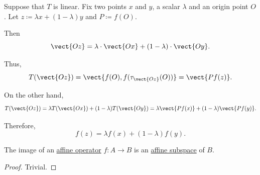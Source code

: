\begin{defproof}
   Suppose that \( T \) is linear. Fix two points \( x \) and \( y \), a scalar \( \lambda \) and an origin point \( O \). Let \( z \coloneqq \lambda x + (1 - \lambda) y \) and \( P \coloneqq f(O) \).

  Then
  \begin{equation*}
    \vect{Oz} = \lambda \cdot \vect{Ox} + (1 - \lambda) \cdot \vect{Oy}.
  \end{equation*}

  Thus,
  \begin{equation*}
    T(\vect{Oz}) = \vect{ f(O), f(\tau_{\vect{Oz}}(O)) } = \vect{ P f(z) }.
  \end{equation*}

  On the other hand,
  \begin{equation*}
    T(\vect{Oz})
    =
    \lambda T(\vect{Ox}) + (1 - \lambda) T(\vect{Oy})
    =
    \lambda \vect{ P f(x) } + (1 - \lambda) \vect{ P f(y) }.
  \end{equation*}

  Therefore,
  \begin{equation*}
    f(z) = \lambda f(x) + (1 - \lambda) f(y).
  \end{equation*}
\end{defproof}

\begin{proposition}\label{thm:image_of_affine_operator}
  The image of an \hyperref[def:affine_operator]{affine operator} \( f: A \to B \) is an \hyperref[def:affine_subspace]{affine subspace} of \( B \).
\end{proposition}
\begin{proof}
  Trivial.
\end{proof}


